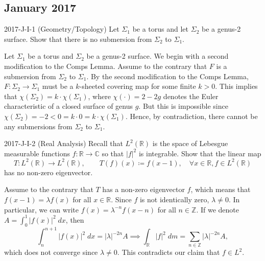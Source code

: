 \documentclass{article}
\begin{document}
\subsection{January 2017}
\begin{prb}{2017-J-I-1 (Geometry/Topology)}
	Let $\Sigma_{1}$ be a torus and let $\Sigma_{2}$ be a genus-2 surface. Show that there is no submersion from $\Sigma_{2}$ to $\Sigma_{1}$. 		
\end{prb}
\begin{solutions}
	Let $\Sigma_{1}$ be a torus and $\Sigma_{2}$ be a genus-2 surface. We begin with a second modification to the Comps Lemma. Assume to the contrary that $F$ is a submersion from $\Sigma_{2}$ to $\Sigma_{1}$. By the second modification to the Comps Lemma, $F: \Sigma_{2} \to \Sigma_{1}$ must be a $k$-sheeted covering map for some finite $k > 0$. This implies that $\chi(\Sigma_{2}) = k \cdot \chi(\Sigma_{1})$, where $\chi(\cdot) = 2 - 2g$ denotes the Euler characteristic of a closed surface of genus $g$. But this is impossible since $\chi(\Sigma_{2}) = -2 < 0 = k \cdot 0 = k \cdot \chi(\Sigma_{1})$. Hence, by contradiction, there cannot be any submersions from $\Sigma_{2}$ to $\Sigma_{1}$. 
\end{solutions}
\begin{prb}{2017-J-I-2 (Real Analysis)}
	Recall that $L^{2}(\mathbb{R})$ is the space of Lebesgue measurable functions $f: \mathbb{R}\to \mathbb{C}$ so that $|f|^{2}$ is integrable. Show that the linear map 
		\begin{equation*}
			T: L^{2}(\mathbb{R}) \to L^{2}(\mathbb{R}), \qquad T(f)(x)\coloneqq f(x - 1), \quad \forall x \in \mathbb{R}, f \in L^{2}(\mathbb{R})
		\end{equation*}
	has no non-zero eigenvector. 
\end{prb}
\begin{solutions}
	Assume to the contrary that $T$ has a non-zero eigenvector $f$, which means that $f(x - 1) = \lambda f(x)$ for all $x \in \mathbb{R}$. Since $f$ is not identically zero, $\lambda \neq 0$. In particular, we can write $f(x) = \lambda^{-n}f(x - n)$ for all $n \in \mathbb{Z}$. If we denote $A = \int_{0}^{1}|f(x)|^{2}\;dx$, then
		\begin{equation}
			\int_{n}^{n + 1}|f(x)|^{2}\;dx = |\lambda|^{-2n}A \implies \int_{\mathbb{R}}|f|^{2}\;dm = \sum_{n \in \mathbb{Z}}|\lambda|^{-2n}A, 
		\end{equation}
	which does not converge since $\lambda \neq 0$. This contradicts our claim that $f \in L^{2}$. 
\end{solutions}
\end{document}
